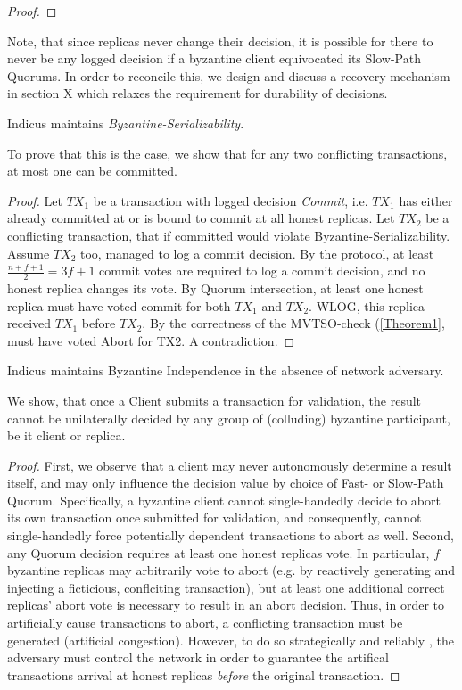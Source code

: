 {\begin{proof}
\end{proof} 

Note, that since replicas never change their decision, it is possible for there to never be any logged decision if a byzantine client equivocated its Slow-Path Quorums. In order to reconcile this, we design and discuss a recovery mechanism in section X which relaxes the requirement for durability of decisions.  


\begin{theorem} 
Indicus maintains \textit{Byzantine-Serializability}.
\end{theorem}
To prove that this is the case, we show that for any two conflicting transactions, at most one can be committed.
\begin{proof}

Let $TX_1$ be a transaction with logged decision \textit{Commit}, i.e. $TX_1$ has either already committed at or is bound to commit at all honest replicas. Let $TX_2$ be a conflicting transaction, that if committed would violate Byzantine-Serializability. Assume $TX_2$ too, managed to log a commit decision. By the protocol, at least  $\frac{n+f+1}{2} = 3f+1$ commit votes are required to log a commit decision, and no honest replica changes its vote. By Quorum intersection, at least one honest replica must have voted commit for both $TX_1$ and $TX_2$. WLOG, this replica received $TX_1$ before $TX_2$. By the correctness of the MVTSO-check (\ref{Theorem1}, must have voted Abort for TX2. A contradiction.


\end{proof}

\begin{theorem} 
Indicus maintains Byzantine Independence in the absence of network adversary.
\end{theorem}

We show, that once a Client submits a transaction for validation, the result cannot be unilaterally decided by any group of (colluding) byzantine participant, be it client or replica.
\begin{proof}

First, we observe that a client may never autonomously determine a result itself, and may only influence the decision value by choice of Fast- or Slow-Path Quorum. Specifically, a byzantine client cannot single-handedly decide to abort its own transaction once submitted for validation, and consequently, cannot single-handedly force potentially dependent transactions to abort as well. 
Second, any Quorum decision requires at least one honest replicas vote. In particular, $f$ byzantine replicas may arbitrarily vote to abort (e.g. by reactively generating and injecting a ficticious, conflciting transaction), but at least one additional correct replicas' abort vote is necessary to result in an abort decision. 
Thus, in order to artificially cause transactions to abort, a conflicting transaction must be generated (artificial congestion). However, to do so strategically and reliably , the adversary must control the network in order to guarantee the artifical transactions arrival at honest replicas \textit{before} the original transaction. 


\end{proof}}
